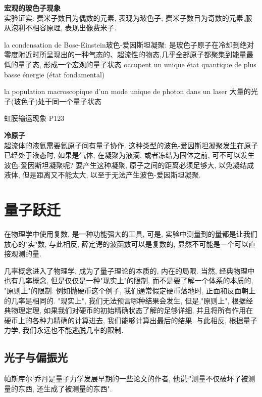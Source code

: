 \documentclass[openany]{book}
\begin{document}
\textbf{宏观的玻色子现象}\\
实验证实: 费米子数目为偶数的元素, 表现为玻色子; 费米子数目为奇数的元素,服从泡利不相容原理, 表现出像费米子.

la condensation de Bose-Einstein玻色-爱因斯坦凝聚: 是玻色子原子在冷却到绝对零度附近时所呈现出的一种气态的、超流性的物态,几乎全部原子都聚集到能量最低的量子态,
形成一个宏观的量子状态  occupent un unique \'etat quantique de plus basse \'energie (\'etat fondamental)

la population macroscopique d'un mode unique de photon dans un laser
大量的光子(玻色子)处于同一个量子状态

虹膜输运现象 P123

\textbf{冷原子}\\
超流体的液氦需要氦原子间有量子协作. 这种类型的波色-爱因斯坦凝聚发生在原子已经处于液态时, 如果是气体, 在凝聚为液滴, 或者冻结为固体之前, 
可不可以发生波色-爱因斯坦凝聚呢? 要产生这种凝聚, 原子之间的距离必须足够大, 以免凝结成液体, 但是距离又不能太大, 以至于无法产生波色-爱因斯坦凝聚.

\section{量子跃迁}
在物理学中使用复数, 是一种功能强大的工具, 可是, 实验中测量到的量都是让我们放心的"实"数, 与此相反, 薛定谔的波函数可以是复数的, 显然不可能是一个可以直接观测的量.

几率概念进入了物理学, 成为了量子理论的本质的, 内在的局限. 当然, 经典物理中也有几率概念, 但是仅仅是一种"现实上"的限制, 而不是要了解一个体系的本质的, "原则上"的限制.
例如抛硬币这个例子, 我们通常假定硬币落地时, 正面和反面朝上的几率是相同的. "现实上", 我们无法预言哪种结果会发生, 
但是,"原则上", 根据经典物理定理, 如果我们对硬币的初始精确状态了解的足够详细, 并且将所有作用在硬币上的各种力精确的计算进去, 我们能够计算出最后的结果. 
与此相反, 根据量子力学, 我们永远也不能逃脱几率的限制.

\subsection{光子与偏振光}
帕斯库尔`乔丹是量子力学发展早期的一些论文的作者, 他说:"测量不仅破坏了被测量的东西, 还生成了被测量的东西".
\end{document}
